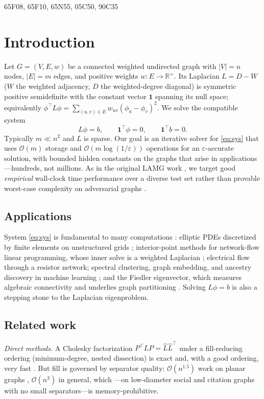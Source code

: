 \documentclass{siamart220329}
\newcommand{\Om}{\mathcal{O}(m)}
\newcommand{\R}{\mathbb{R}}
\begin{document}
\begin{AMS}
65F08, 65F10, 65N55, 05C50, 90C35
\end{AMS}

\section{Introduction}\label{sec:intro}
Let $G=(V,E,w)$ be a connected weighted undirected graph with $|V|=n$ nodes, $|E|=m$
edges, and positive weights $w:E\to\R^+$. Its Laplacian $L=D-W$ ($W$ the weighted
adjacency, $D$ the weighted-degree diagonal) is symmetric positive semidefinite with the
constant vector $\mathbf 1$ spanning its null space; equivalently
$\phi^{\top}L\phi=\sum_{(u,v)\in E}w_{uv}(\phi_u-\phi_v)^2$. We solve the compatible
system
\begin{equation}\label{eq:sys}
L\phi=b,\qquad \mathbf 1^{\top}\phi=0,\qquad \mathbf 1^{\top}b=0 .
\end{equation}
Typically $m\ll n^2$ and $L$ is sparse. Our goal is an iterative solver for
\eqref{eq:sys} that uses $\Om$ storage and $\mathcal{O}(m\log(1/\varepsilon))$ operations
for an $\varepsilon$-accurate solution, with bounded hidden constants on the graphs
that arise in applications---hundreds, not millions. As in the original LAMG work
\cite{lamg}, we target good \emph{empirical} wall-clock time performance over a diverse test set rather
than provable worst-case complexity on adversarial graphs \cite{spielman-review}.

\subsection{Applications}\label{sec:apps}
System \eqref{eq:sys} is fundamental to many computations \cite[\S2]{spielman-review}:
elliptic PDEs discretized by finite elements on unstructured grids \cite{boman-fem};
interior-point methods for network-flow linear programming, whose inner solve is a
weighted Laplacian \cite{daitch-spielman}; electrical flow through a resistor network;
spectral clustering, graph embedding, and ancestry discovery in machine learning
\cite{ng-jordan-weiss}; and the Fiedler eigenvector, which measures algebraic
connectivity and underlies graph partitioning \cite{fiedler}. Solving $L\phi=b$ is also a stepping stone to the Laplacian eigenproblem.

\subsection{Related work}\label{sec:related}
\emph{Direct methods.} A Cholesky factorization $P^{\top}LP=\hat L\hat L^{\top}$ under a
fill-reducing ordering (minimum-degree, nested dissection) is exact and, with a good
ordering, very fast \cite{davis-cholmod,george-nd}. But fill is governed by separator
quality: $\mathcal{O}(n^{1.5})$ work on planar graphs \cite{lipton-rose-tarjan},
$\mathcal{O}(n^3)$ in general, which ---on low-diameter social and citation graphs with no
small separators---is memory-prohibitive.
\end{document}
